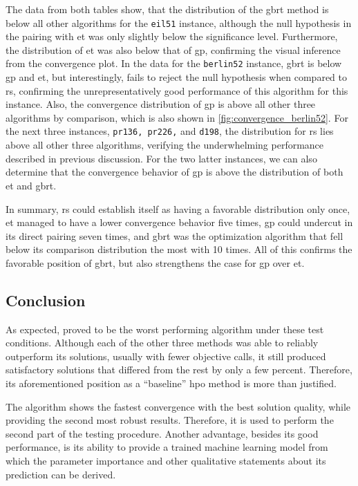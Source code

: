 The data from both tables show, that the distribution of the \gls{gbrt} method is below all other algorithms for the \texttt{eil51} instance, although the null hypothesis in the pairing with \gls{et} was only slightly below the significance level. Furthermore, the distribution of \gls{et} was also below that of \gls{gp}, confirming the visual inference from the convergence plot. 
In the data for the \texttt{berlin52} instance, \gls{gbrt} is below \gls{gp} and \gls{et}, but interestingly, fails to reject the null hypothesis when compared to \gls{rs}, confirming the unrepresentatively good performance of this algorithm for this instance. Also, the convergence distribution of \gls{gp} is above all other three algorithms by comparison, which is also shown in \cref{fig:convergence_berlin52}.
For the next three instances, \texttt{pr136, pr226,} and \texttt{d198}, the distribution for \gls{rs} lies above all other three algorithms, verifying the underwhelming performance described in previous discussion. For the two latter instances, we can also determine that the convergence behavior of \gls{gp} is above the distribution of both \gls{et} and \gls{gbrt}.

In summary, \gls{rs} could establish itself as having a favorable distribution only once, \gls{et} managed to have a lower convergence behavior five times, \gls{gp} could undercut in its direct pairing seven times, and \gls{gbrt} was the optimization algorithm that fell below its comparison distribution the most with 10 times. All of this confirms the favorable position of \gls{gbrt}, but also strengthens the case for \gls{gp} over \gls{et}.

\subsection{Conclusion}

As expected,  proved to be the worst performing algorithm under these test conditions. Although each of the other three methods was able to reliably outperform its solutions, usually with fewer objective calls, it still produced satisfactory solutions that differed from the rest by only a few percent. Therefore, its aforementioned position as a \enquote{baseline} \gls{hpo} method is more than justified.

The  algorithm shows the fastest convergence with the best solution quality, while providing the second most robust results. Therefore, it is used to perform the second part of the testing procedure. Another advantage, besides its good performance, is its ability to provide a trained machine learning model from which the parameter importance and other qualitative statements about its prediction can be derived.

